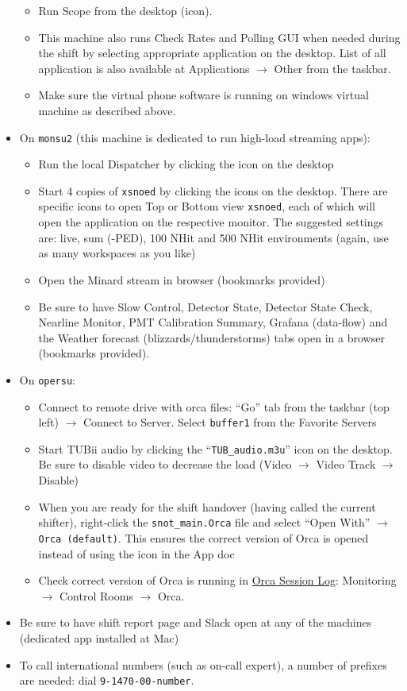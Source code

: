 \documentclass[12pt, a4paper]{article}
\begin{document}
\begin{itemize}
\begin{itemize}
			\item Run Scope from the desktop (icon).
			\item This machine also runs Check Rates and Polling GUI when needed during the shift by selecting appropriate application on the desktop. List of all application is also available at Applications $\rightarrow$ Other from the taskbar.
		\item Make sure the virtual phone software is running on windows virtual machine as described above.
	\end{itemize}
	\item On {\tt monsu2} (this machine is dedicated to run high-load streaming apps):
	\begin{itemize}
		\item Run the local Dispatcher by clicking the icon on the desktop
		\item Start 4 copies of {\tt xsnoed} by clicking the icons on the desktop. There are specific icons to open Top or Bottom view {\tt xsnoed}, each of which will open the application on the respective monitor. The suggested settings are: live, sum (-PED), 100 NHit and 500 NHit environments (again, use as many workspaces as you like)
		\item Open the Minard stream in browser (bookmarks provided)
		\item Be sure to have Slow Control, Detector State, Detector State Check, Nearline Monitor, PMT Calibration Summary, Grafana (data-flow) and the Weather forecast (blizzards/thunderstorms) tabs open in a browser (bookmarks provided).
	\end{itemize}
	\item On {\tt opersu}:
	\begin{itemize}
		\item Connect to remote drive with orca files: ``Go'' tab from the taskbar (top left) $\rightarrow$ Connect to Server. Select {\tt buffer1} from the Favorite Servers
		\item Start TUBii audio by clicking the ``{\tt TUB\_audio.m3u}'' icon on the desktop. Be sure to disable video to decrease the load (Video $\rightarrow$ Video Track $\rightarrow$ Disable)
		\item When you are ready for the shift handover (having called the current shifter), right-click the {\tt snot\_main.Orca} file and select ``Open With'' $\rightarrow$ {\tt Orca (default)}. This ensures the correct version of Orca is opened instead of using the icon in the App doc
		\item Check correct version of Orca is running in \href{https://snopl.us/monitoring/orca-session-logs}{Orca Session Log}: Monitoring $\rightarrow$ Control Rooms $\rightarrow$ Orca.
	\end{itemize}
\item Be sure to have shift report page and Slack open at any of the machines (dedicated app installed at Mac)
\item To call international numbers (such as on-call expert), a number of prefixes are needed: dial {\tt 9-1470-00-number}.
\end{itemize}
\end{document}
